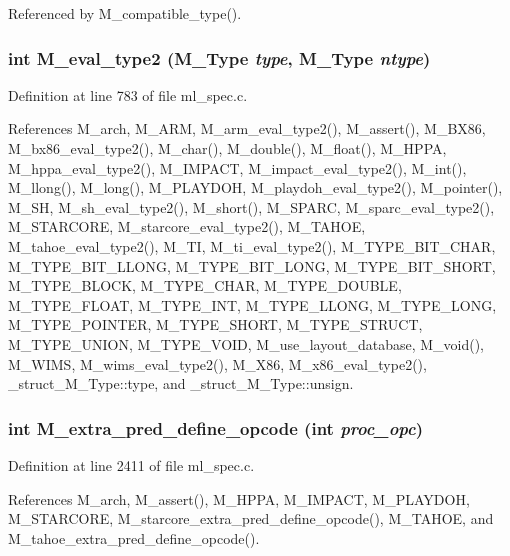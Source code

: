 Referenced by M\_\-compatible\_\-type().
\subsubsection{\setlength{\rightskip}{0pt plus 5cm}int M\_\-eval\_\-type2 (\bf{M\_\-Type} {\em type}, \bf{M\_\-Type} {\em ntype})}\label{ml__spec_8c_eef9b61928901886bca65b6be37ea956}




Definition at line 783 of file ml\_\-spec.c.

References M\_\-arch, M\_\-ARM, M\_\-arm\_\-eval\_\-type2(), M\_\-assert(), M\_\-BX86, M\_\-bx86\_\-eval\_\-type2(), M\_\-char(), M\_\-double(), M\_\-float(), M\_\-HPPA, M\_\-hppa\_\-eval\_\-type2(), M\_\-IMPACT, M\_\-impact\_\-eval\_\-type2(), M\_\-int(), M\_\-llong(), M\_\-long(), M\_\-PLAYDOH, M\_\-playdoh\_\-eval\_\-type2(), M\_\-pointer(), M\_\-SH, M\_\-sh\_\-eval\_\-type2(), M\_\-short(), M\_\-SPARC, M\_\-sparc\_\-eval\_\-type2(), M\_\-STARCORE, M\_\-starcore\_\-eval\_\-type2(), M\_\-TAHOE, M\_\-tahoe\_\-eval\_\-type2(), M\_\-TI, M\_\-ti\_\-eval\_\-type2(), M\_\-TYPE\_\-BIT\_\-CHAR, M\_\-TYPE\_\-BIT\_\-LLONG, M\_\-TYPE\_\-BIT\_\-LONG, M\_\-TYPE\_\-BIT\_\-SHORT, M\_\-TYPE\_\-BLOCK, M\_\-TYPE\_\-CHAR, M\_\-TYPE\_\-DOUBLE, M\_\-TYPE\_\-FLOAT, M\_\-TYPE\_\-INT, M\_\-TYPE\_\-LLONG, M\_\-TYPE\_\-LONG, M\_\-TYPE\_\-POINTER, M\_\-TYPE\_\-SHORT, M\_\-TYPE\_\-STRUCT, M\_\-TYPE\_\-UNION, M\_\-TYPE\_\-VOID, M\_\-use\_\-layout\_\-database, M\_\-void(), M\_\-WIMS, M\_\-wims\_\-eval\_\-type2(), M\_\-X86, M\_\-x86\_\-eval\_\-type2(), \_\-struct\_\-M\_\-Type::type, and \_\-struct\_\-M\_\-Type::unsign.
\subsubsection{\setlength{\rightskip}{0pt plus 5cm}int M\_\-extra\_\-pred\_\-define\_\-opcode (int {\em proc\_\-opc})}\label{ml__spec_8c_0f26ff16b9d8f5cd813b4cc20714e4cc}




Definition at line 2411 of file ml\_\-spec.c.

References M\_\-arch, M\_\-assert(), M\_\-HPPA, M\_\-IMPACT, M\_\-PLAYDOH, M\_\-STARCORE, M\_\-starcore\_\-extra\_\-pred\_\-define\_\-opcode(), M\_\-TAHOE, and M\_\-tahoe\_\-extra\_\-pred\_\-define\_\-opcode().

